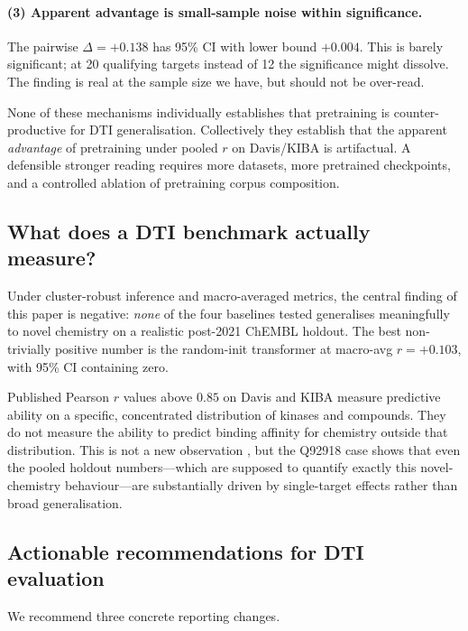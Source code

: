 \documentclass[11pt,a4paper]{article}
\begin{document}
\paragraph{(3) Apparent advantage is small-sample noise within significance.}
The pairwise $\Delta = +0.138$ has 95\% CI with lower bound $+0.004$.
This is barely significant; at 20 qualifying targets instead of 12 the
significance might dissolve.
The finding is real at the sample size we have, but should not be over-read.

None of these mechanisms individually establishes that pretraining is
counter-productive for DTI generalisation.
Collectively they establish that the apparent \emph{advantage} of pretraining
under pooled $r$ on Davis/KIBA is artifactual.
A defensible stronger reading requires more datasets, more pretrained
checkpoints, and a controlled ablation of pretraining corpus composition.

\subsection{What does a DTI benchmark actually measure?}

Under cluster-robust inference and macro-averaged metrics, the central finding
of this paper is negative: \emph{none} of the four baselines tested generalises
meaningfully to novel chemistry on a realistic post-2021 ChEMBL holdout.
The best non-trivially positive number is the random-init transformer at
macro-avg $r = +0.103$, with 95\% CI containing zero.

Published Pearson $r$ values above $0.85$ on Davis and KIBA measure predictive
ability on a specific, concentrated distribution of kinases and compounds.
They do not measure the ability to predict binding affinity for chemistry
outside that distribution.
This is not a new observation \citep{wallach2018most,bender2022evaluation}, but
the Q92918 case shows that even the pooled holdout numbers---which are
supposed to quantify exactly this novel-chemistry behaviour---are
substantially driven by single-target effects rather than broad generalisation.

\subsection{Actionable recommendations for DTI evaluation}

We recommend three concrete reporting changes.
\end{document}
